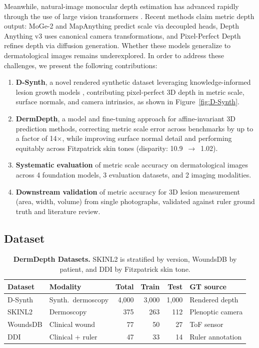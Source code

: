 \documentclass[11pt]{ucthesis}
\begin{document}
Meanwhile, natural-image monocular depth estimation has advanced rapidly through the use of large vision transformers \cite{oquab2023dinov2}. Recent methods claim metric depth output: MoGe-2 \cite{wang2025moge2} and MapAnything \cite{keetha2026mapanything} predict scale via decoupled heads, Depth Anything v3 \cite{depthanything3} uses canonical camera transformations, and Pixel-Perfect Depth \cite{xu2025pixel} refines depth via diffusion generation. Whether these models generalize to dermatological images remains underexplored. In order to address these challenges, we present the following contributions:

\begin{enumerate}
    \item \textbf{D-Synth}, a novel rendered synthetic dataset leveraging knowledge-informed lesion growth models \cite{kim-2024}, contributing pixel-perfect 3D depth in metric scale, surface normals, and camera intrinsics, as shown in Figure~\ref{fig:D-Synth}.

    \item \textbf{DermDepth}, a model and fine-tuning approach for affine-invariant 3D prediction methods, correcting metric scale error across benchmarks by up to a factor of 14$\times$, while improving surface normal detail and performing equitably across Fitzpatrick skin tones (disparity: 10.9~$\rightarrow$~1.02).

    \item \textbf{Systematic evaluation} of metric scale accuracy on dermatological images across 4 foundation models, 3 evaluation datasets, and 2 imaging modalities.

    \item \textbf{Downstream validation} of metric accuracy for 3D lesion measurement (area, width, volume) from single photographs, validated against ruler ground truth and literature review.
\end{enumerate}

\subsection{Dataset}\label{sec:dd_datasets}

\begin{table}[t]
\centering
\caption{\textbf{DermDepth Datasets.} SKINL2 is stratified by version, WoundsDB by patient, and DDI by Fitzpatrick skin tone.}
\label{tab:dd_datasets}
\small
\setlength\tabcolsep{4pt}
\begin{tabular}{@{}l l r r r l@{}}
\toprule
Dataset & Modality & Total & Train & Test & GT source \\
\midrule
D-Synth  & Synth.\ dermoscopy & 4{,}000 & 3{,}000 & 1{,}000   & Rendered depth \\
SKINL2   & Dermoscopy         &     375 &     263 & 112   & Plenoptic camera \\
WoundsDB & Clinical wound     &      77 &      50 &  27   & ToF sensor \\
DDI      & Clinical + ruler   &      47 &      33 &  14   & Ruler annotation \\
\bottomrule
\end{tabular}
\end{table}
\end{document}

